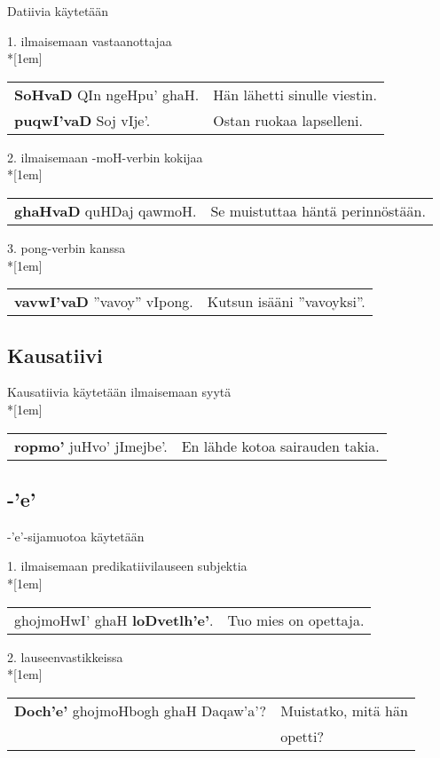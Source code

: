 \documentclass{book}
\begin{document}
Datiivia käytetään

1. ilmaisemaan vastaanottajaa\\*[1em]
\begin{tabular}{l l}
    \textbf{SoHvaD} QIn ngeHpu' ghaH. & Hän lähetti sinulle viestin. \\
    \textbf{puqwI'vaD} Soj vIje'. & Ostan ruokaa lapselleni. \\
\end{tabular}

2. ilmaisemaan -moH-verbin kokijaa
\\*[1em]
\begin{tabular}{l l}
    \textbf{ghaHvaD} quHDaj qawmoH. & Se muistuttaa häntä perinnöstään. \\
\end{tabular}

3. pong-verbin kanssa\\*[1em]
\begin{tabular}{l l}
    \textbf{vavwI'vaD} ''vavoy'' vIpong. & Kutsun isääni ''vavoyksi''. \\
\end{tabular}

\subsection{Kausatiivi}

Kausatiivia käytetään ilmaisemaan syytä\\*[1em]
\begin{tabular}{l l}
    \textbf{ropmo'} juHvo' jImejbe'. & En lähde kotoa sairauden takia. \\
\end{tabular}

\subsection{-'e'}

-'e'-sijamuotoa käytetään

1. ilmaisemaan predikatiivilauseen subjektia\\*[1em]
\begin{tabular}{l l}
    ghojmoHwI' ghaH \textbf{loDvetlh'e'}. & Tuo mies on opettaja. \\
\end{tabular}

2. lauseenvastikkeissa\\*[1em]
\begin{tabular}{l l}
    \textbf{Doch'e'} ghojmoHbogh ghaH Daqaw'a'? & Muistatko, mitä hän \\
    & opetti? \\
\end{tabular}
\end{document}
